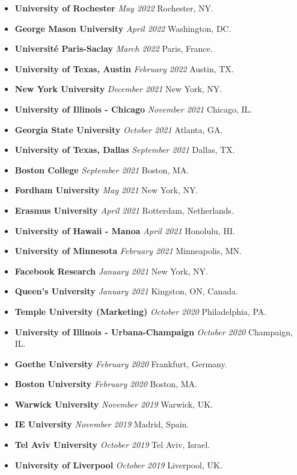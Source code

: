 \documentclass[10.5pt,letterpaper,sans]{moderncv}        %
\begin{document}
\begin{itemize}
\item \textbf{University of Rochester} \textit{May 2022} Rochester, NY.
\item \textbf{George Mason University} \textit{April 2022} Washington, DC.
\item \textbf{Universit\'{e} Paris-Saclay} \textit{March 2022} Paris, France.
\item \textbf{University of Texas, Austin} \textit{February 2022} Austin, TX.
\item \textbf{New York University} \textit{December 2021} New York, NY.
\item \textbf{University of Illinois - Chicago} \textit{November 2021} Chicago, IL.
\item \textbf{Georgia State University} \textit{October 2021} Atlanta, GA.
\item \textbf{University of Texas, Dallas} \textit{September 2021} Dallas, TX.
\item \textbf{Boston College} \textit{September 2021} Boston, MA.
\item \textbf{Fordham University} \textit{May 2021} New York, NY.
\item \textbf{Erasmus University} \textit{April 2021} Rotterdam, Netherlands.
\item \textbf{University of Hawaii - Manoa} \textit{April 2021} Honolulu, HI.
\item \textbf{University of Minnesota} \textit{February 2021} Minneapolis, MN.
\item \textbf{Facebook Research} \textit{January 2021} New York, NY.
\item \textbf{Queen's University} \textit{January 2021} Kingston, ON, Canada.
\item \textbf{Temple University (Marketing)} \textit{October 2020} Philadelphia, PA.
\item \textbf{University of Illinois - Urbana-Champaign} \textit{October 2020} Champaign, IL.
\item \textbf{Goethe University} \textit{February 2020} Frankfurt, Germany.
\item \textbf{Boston University} \textit{February 2020} Boston, MA.
\item \textbf{Warwick University} \textit{November 2019} Warwick, UK.
\item \textbf{IE University} \textit{November 2019} Madrid, Spain.
\item \textbf{Tel Aviv University} \textit{October 2019} Tel Aviv, Israel.
\item \textbf{University of Liverpool} \textit{October 2019} Liverpool, UK.

\end{itemize}
\end{document}
